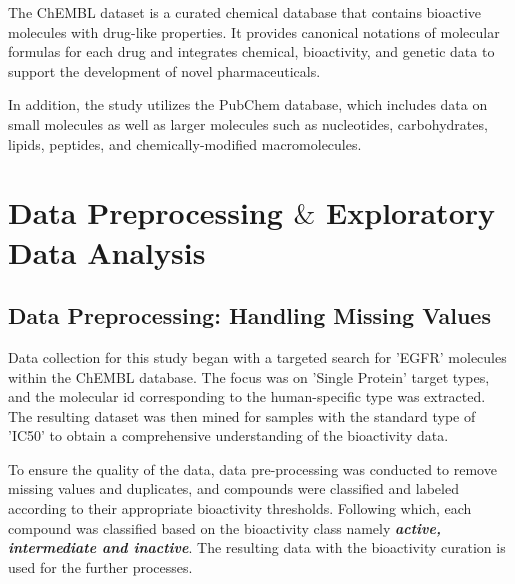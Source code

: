 \documentclass[fleqn,10pt]{SelfArx} %
\begin{document}
The ChEMBL dataset is a curated chemical database that contains bioactive molecules with drug-like properties. It provides canonical notations of molecular formulas for each drug and integrates chemical, bioactivity, and genetic data to support the development of novel pharmaceuticals. 

In addition, the study utilizes the PubChem database, which includes data on small molecules as well as larger molecules such as nucleotides, carbohydrates, lipids, peptides, and chemically-modified macromolecules.

\bigskip


\section{Data Preprocessing $\&$ Exploratory Data Analysis} %


\subsection{Data Preprocessing: Handling Missing Values}
Data collection for this study began with a targeted search for 'EGFR' molecules within the ChEMBL database. The focus was on 'Single Protein' target types, and the molecular id corresponding to the human-specific type was extracted. The resulting dataset was then mined for samples with the standard type of 'IC50' to obtain a comprehensive understanding of the bioactivity data. 

To ensure the quality of the data, data pre-processing was conducted to remove missing values and duplicates, and compounds were classified and labeled according to their appropriate bioactivity thresholds. Following which, each compound was classified based on the bioactivity class namely \textbf{\textit{active, intermediate and inactive}}. The resulting data with the bioactivity curation is used for the further processes. 
\end{document}
